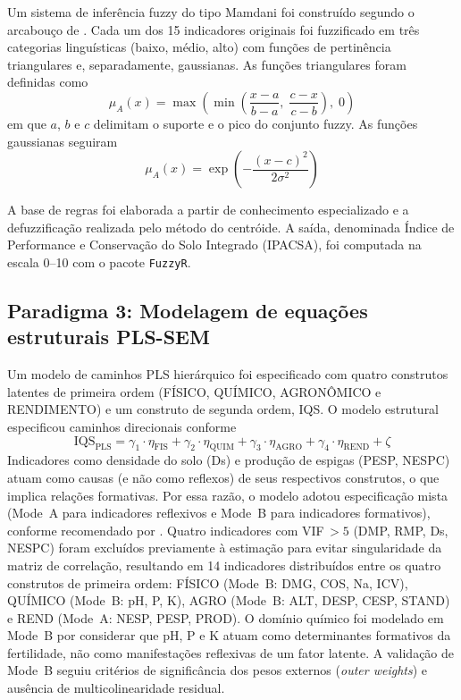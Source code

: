\documentclass[pdflatex,sn-basic]{sn-jnl}%
\begin{document}
Um sistema de inferência fuzzy do tipo Mamdani foi construído segundo o arcabouço de \cite{Torbert2008}. Cada um dos 15 indicadores originais foi fuzzificado em três categorias linguísticas (baixo, médio, alto) com funções de pertinência triangulares e, separadamente, gaussianas. As funções triangulares foram definidas como
\begin{equation}
\mu_A(x) = \max\left(\min\left(\frac{x-a}{b-a},\; \frac{c-x}{c-b}\right),\; 0\right)
\label{eq:trimf}
\end{equation}
em que $a$, $b$ e $c$ delimitam o suporte e o pico do conjunto fuzzy. As funções gaussianas seguiram
\begin{equation}
\mu_A(x) = \exp\left(-\frac{(x-c)^2}{2\sigma^2}\right)
\label{eq:gaussmf}
\end{equation}

A base de regras foi elaborada a partir de conhecimento especializado e a defuzzificação realizada pelo método do centróide. A saída, denominada Índice de Performance e Conservação do Solo Integrado (IPACSA), foi computada na escala 0--10 com o pacote \texttt{FuzzyR}.

\subsection{Paradigma 3: Modelagem de equações estruturais PLS-SEM}\label{subsec:sem}

Um modelo de caminhos PLS hierárquico foi especificado com quatro construtos latentes de primeira ordem (FÍSICO, QUÍMICO, AGRONÔMICO e RENDIMENTO) e um construto de segunda ordem, IQS. O modelo estrutural especificou caminhos direcionais conforme
\begin{equation}
\text{IQS}_{\text{PLS}} = \gamma_1 \cdot \eta_{\text{FIS}} + \gamma_2 \cdot \eta_{\text{QUIM}} + \gamma_3 \cdot \eta_{\text{AGRO}} + \gamma_4 \cdot \eta_{\text{REND}} + \zeta
\label{eq:plssem}
\end{equation}
Indicadores como densidade do solo (Ds) e produção de espigas (PESP, NESPC) atuam como causas (e não como reflexos) de seus respectivos construtos, o que implica relações formativas. Por essa razão, o modelo adotou especificação mista (Mode~A para indicadores reflexivos e Mode~B para indicadores formativos), conforme recomendado por \cite{Hair2019}. Quatro indicadores com VIF\,$> 5$ (DMP, RMP, Ds, NESPC) foram excluídos previamente à estimação para evitar singularidade da matriz de correlação, resultando em 14 indicadores distribuídos entre os quatro construtos de primeira ordem: FÍSICO (Mode~B: DMG, COS, Na, ICV), QUÍMICO (Mode~B: pH, P, K), AGRO (Mode~B: ALT, DESP, CESP, STAND) e REND (Mode~A: NESP, PESP, PROD). O domínio químico foi modelado em Mode~B por considerar que pH, P e K atuam como determinantes formativos da fertilidade, não como manifestações reflexivas de um fator latente. A validação de Mode~B seguiu critérios de significância dos pesos externos (\textit{outer weights}) e ausência de multicolinearidade residual.
\end{document}
